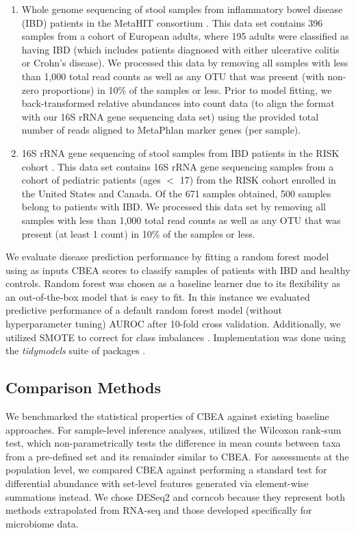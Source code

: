 \begin{enumerate}
\item Whole genome sequencing of stool samples from inflammatory bowel disease (IBD) patients in the MetaHIT consortium \cite{nielsen2014}. This data set contains 396 samples from a cohort of European adults, where 195 adults were classified as having IBD (which includes patients diagnosed with either ulcerative colitis or Crohn's disease). We processed this data by removing all samples with less than 1,000 total read counts as well as any OTU that was present (with non-zero proportions) in 10\% of the samples or less. Prior to model fitting, we back-transformed relative abundances into count data (to align the format with our 16S rRNA gene sequencing data set) using the provided total number of reads aligned to MetaPhlan marker genes (per sample).   

\item 16S rRNA gene sequencing of stool samples from IBD patients in the RISK cohort \cite{gevers2014}. This data set contains 16S rRNA gene sequencing samples from a cohort of pediatric patients (ages $<$ 17) from the RISK cohort enrolled in the United States and Canada. Of the 671 samples obtained, 500 samples belong to patients with IBD. We processed this data set by removing all samples with less than 1,000 total read counts as well as any OTU that was present (at least 1 count) in 10\% of the samples or less.   
\end{enumerate}

We evaluate disease prediction performance by fitting a random forest model \cite{breiman2001} using as inputs CBEA scores to classify samples of patients with IBD and healthy controls. Random forest was chosen as a baseline learner due to its flexibility as an out-of-the-box model that is easy to fit. In this instance we evaluated predictive performance of a default random forest model (without hyperparameter tuning) AUROC after 10-fold cross validation. Additionally, we utilized SMOTE to correct for class imbalances \cite{chawla2002}. Implementation was done using the \emph{tidymodels} suite of packages \cite{kuhn2020}.   

\subsection{Comparison Methods} 
We benchmarked the statistical properties of CBEA against existing baseline approaches. For sample-level inference analyses, utilized the Wilcoxon rank-sum test, which non-parametrically tests the difference in mean counts between taxa from a pre-defined set and its remainder similar to CBEA. For assessments at the population level, we compared CBEA against performing a standard test for differential abundance with set-level features generated via element-wise summations instead. We chose DESeq2 \cite{love2014} and corncob \cite{martin2020} because they represent both methods extrapolated from RNA-seq \cite{mcmurdie2014} and those developed specifically for microbiome data.   

